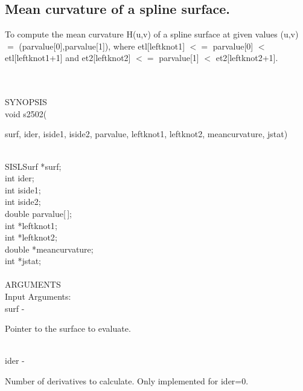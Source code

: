 \subsection{Mean curvature of a spline surface.}
\begin{minipg1}
 To compute the mean curvature H(u,v) of a spline surface at given
                   values (u,v) $=$ (parvalue[0],parvalue[1]), where
                       etl[leftknot1] $<=$ parvalue[0] $<$ etl[leftknot1+1] and
                       et2[leftknot2] $<=$ parvalue[1] $<$ et2[leftknot2+1].
\end{minipg1} \\ \\
SYNOPSIS\\
        \>  void s2502(\begin{minipg3}
            {\fov surf},  {\fov ider},  {\fov iside1},  {\fov iside2},  {\fov parvalue},  {\fov leftknot1},  {\fov leftknot2},
	     {\fov meancurvature},  {\fov jstat})
                \end{minipg3}\\
                \>\>    SISLSurf \> *{\fov surf};\\
                \>\>    int    \>  {\fov ider};\\
                \>\>    int    \>  {\fov iside1};\\
                \>\>    int    \>  {\fov iside2};\\
                \>\>    double \> {\fov parvalue}[\,];\\
                \>\>    int \> *{\fov leftknot1};\\
                \>\>    int \> *{\fov leftknot2};\\
                \>\>    double \> *{\fov meancurvature};\\
                \>\>    int \> *{\fov jstat};\\
\\
ARGUMENTS\\
	\>Input Arguments:\\
        \>\>    {\fov surf}\> - \>  \begin{minipg2}
                     Pointer to the surface to evaluate.
                               \end{minipg2}\\[0.8ex]
        \>\>    {\fov ider}\> - \>  \begin{minipg2}
                     Number of derivatives to calculate.
                     Only implemented for ider=0.
                               \end{minipg2}\\[0.8ex]
